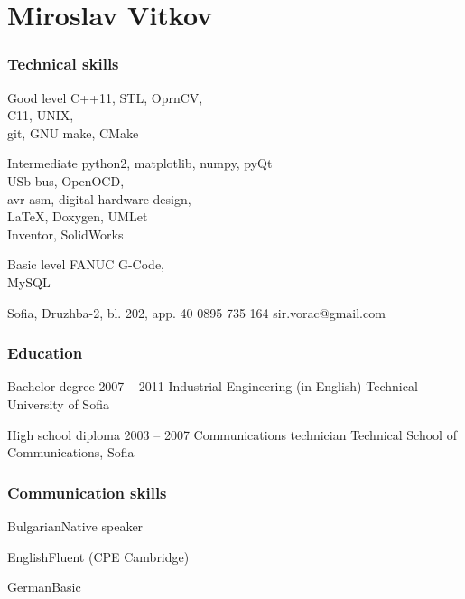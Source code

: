 \documentclass{tccv}
\begin{document}
\part{Miroslav Vitkov}


\section{Technical skills}
\begin{factlist}
\item{Good level}
{
     C++11, STL, OprnCV,               \\
     C11, UNIX,                        \\
     git, GNU make, CMake
}

\item{Intermediate}
{
    python2, matplotlib, numpy, pyQt   \\
    USb bus, OpenOCD,                  \\
    avr-asm, digital hardware design,  \\
    LaTeX, Doxygen, UMLet              \\
    Inventor, SolidWorks
}

\item{Basic level}
{
    FANUC G-Code,                      \\
    MySQL
}
\end{factlist}


\personal
    {Sofia, Druzhba-2, bl. 202, app. 40}
    {0895 735 164}
    {sir.vorac@gmail.com}


\section{Education}
\begin{yearlist}
\item[Bachelor degree]{2007 -- 2011}
     {Industrial Engineering (in English)}
     {Technical University of Sofia}

\item[High school diploma]{2003 -- 2007}
     {Communications technician}
     {Technical School of Communications, Sofia}
\end{yearlist}


\section{Communication skills}
\begin{factlist}
\item{Bulgarian}{Native speaker}
\item{English}{Fluent (CPE Cambridge)}
\item{German}{Basic}
\end{factlist}
\end{document}
